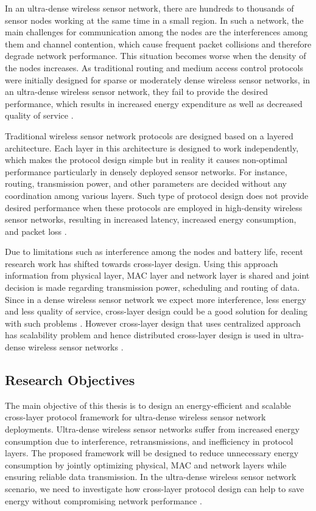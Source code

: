 \documentclass[a4paper,fleqn]{cas-dc}
\numberwithin{equation}{section}
\begin{document}
In an ultra-dense wireless sensor network, there are hundreds to thousands of sensor nodes working at the same time in a small region. In such a network, the main challenges for communication among the nodes are the interferences among them and channel contention, which cause frequent packet collisions and therefore degrade network performance. This situation becomes worse when the density of the nodes increases. As traditional routing and medium access control protocols were initially designed for sparse or moderately dense wireless sensor networks, in an ultra-dense wireless sensor network, they fail to provide the desired performance, which results in increased energy expenditure as well as decreased quality of service \cite{Khamzaev2025498}.

Traditional wireless sensor network protocols are designed based on a layered architecture. Each layer in this architecture is designed to work independently, which makes the protocol design simple but in reality it causes non-optimal performance particularly in densely deployed sensor networks. For instance, routing, transmission power, and other parameters are decided without any coordination among various layers. Such type of protocol design does not provide desired performance when these protocols are employed in high-density wireless sensor networks, resulting in increased latency, increased energy consumption, and packet loss \cite{Cherappa2023}.

Due to limitations such as interference among the nodes and battery life, recent research work has shifted towards cross-layer design. Using this approach information from physical layer, MAC layer and network layer is shared and joint decision is made regarding transmission power, scheduling and routing of data. Since in a dense wireless sensor network we expect more interference, less energy and less quality of service, cross-layer design could be a good solution for dealing with such problems \cite{He2025157}. However cross-layer design that uses centralized approach has scalability problem and hence distributed cross-layer design is used in ultra-dense wireless sensor networks \cite{Mustafa2024}.

\subsection{Research Objectives}

The main objective of this thesis is to design an energy-efficient and scalable cross-layer protocol framework for ultra-dense wireless sensor network deployments. Ultra-dense wireless sensor networks suffer from increased energy consumption due to interference, retransmissions, and inefficiency in protocol layers. The proposed framework will be designed to reduce unnecessary energy consumption by jointly optimizing physical, MAC and network layers while ensuring reliable data transmission. In the ultra-dense wireless sensor network scenario, we need to investigate how cross-layer protocol design can help to save energy without compromising network performance \cite{Singh2025}.
\end{document}
